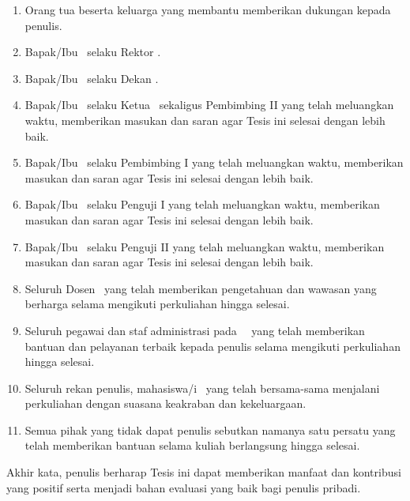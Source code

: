 \begin{enumerate}
  \item Orang tua beserta keluarga yang membantu memberikan dukungan
    kepada penulis.
  \item Bapak/Ibu \thesisRektorNama\ selaku Rektor \thesisUniversitas.
  \item Bapak/Ibu \thesisDekanNama\ selaku Dekan \thesisFakultas.
  \item Bapak/Ibu \thesisKaprodiNama\ selaku Ketua \thesisProgramStudi\
    sekaligus Pembimbing II yang telah meluangkan waktu, memberikan
    masukan dan saran agar Tesis ini selesai dengan lebih baik.
  \item Bapak/Ibu \thesisPembimbingSatuNama\ selaku Pembimbing I yang
    telah meluangkan waktu, memberikan masukan dan saran agar Tesis
    ini selesai dengan lebih baik.
  \item Bapak/Ibu \thesisPengujiSatu\ selaku Penguji I yang telah
    meluangkan waktu, memberikan masukan dan saran agar Tesis ini
    selesai dengan lebih baik.
  \item Bapak/Ibu \thesisPengujiDua\ selaku Penguji II yang telah
    meluangkan waktu, memberikan masukan dan saran agar Tesis ini
    selesai dengan lebih baik.
  \item Seluruh Dosen \thesisProgramStudi\ yang telah memberikan
    pengetahuan dan wawasan yang berharga selama mengikuti perkuliahan
    hingga selesai.
  \item Seluruh pegawai dan staf administrasi pada \thesisProgramStudi\
    \thesisFakultas\ yang telah memberikan bantuan dan pelayanan
    terbaik kepada penulis selama mengikuti perkuliahan hingga
    selesai.
  \item Seluruh rekan penulis, mahasiswa/i \thesisProgramStudi\ yang
    telah bersama-sama menjalani perkuliahan dengan suasana keakraban
    dan kekeluargaan.
  \item Semua pihak yang tidak dapat penulis sebutkan namanya satu
    persatu yang telah memberikan bantuan selama kuliah berlangsung
    hingga selesai.
\end{enumerate}

Akhir kata, penulis berharap Tesis ini dapat memberikan manfaat dan
kontribusi yang positif serta menjadi bahan evaluasi yang baik bagi
penulis pribadi.

\baselineskip
\noindent\hfill%
\begin{minipage}[t]{0.45\linewidth}
\signOff{\thesisAuthor}{\thesisNim}
\end{minipage}

